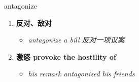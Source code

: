 
\begin{frame}
{\huge antagonize}
\begin{center}
\begin{enumerate}\Large
  \item \textbf{反对、敌对}
  \begin{itemize}
    \item \em{\Large{antagonize a bill 反对一项议案}}
  \end{itemize}
  \item \textbf{激怒 provoke the hostility of}
  \begin{itemize}
    \item \em{\Large{his remark antagonized his friends}}
  \end{itemize}
\end{enumerate}
\end{center}
\end{frame}
